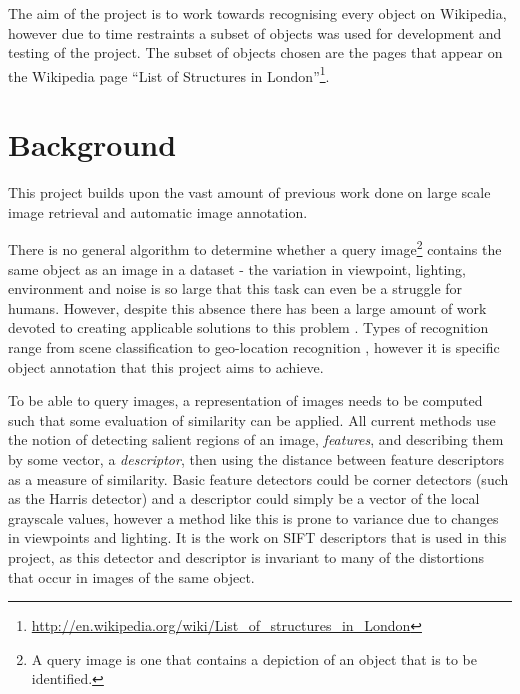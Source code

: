\documentclass[11pt, onecolumn, a4paper, final]{report} %
\begin{document}
The aim of the project is to work towards recognising every object on Wikipedia, however due to time restraints a subset of objects was used for development and testing of the project. The subset of objects chosen are the pages that appear on the Wikipedia page ``List of Structures in London''\footnote{\url{http://en.wikipedia.org/wiki/List_of_structures_in_London}}.
	


\chapter{Background}
\label{chpt:background}
This project builds upon the vast amount of previous work done on large scale image retrieval and automatic image annotation.

There is no general algorithm to determine whether a query image\footnote{A query image is one that contains a depiction of an object that is to be identified.} contains the same object as an image in a dataset - the variation in viewpoint, lighting, environment and noise is so large that this task can even be a struggle for humans. However, despite this absence there has been a large amount of work devoted to creating applicable solutions to this problem \cite{quack09,rootsift12,recognitiontree2006,videogoogle2003,philbin2007}. Types of recognition range from scene classification \cite{sceneclass06} to geo-location recognition \cite{knopp10}, however it is specific object annotation that this project aims to achieve.

To be able to query images, a representation of images needs to be computed such that some evaluation of similarity can be applied. All current methods use the notion of detecting salient regions of an image, \emph{features}, and describing them by some vector, a \emph{descriptor}, then using the distance between feature descriptors as a measure of similarity. Basic feature detectors could be corner detectors (such as the Harris detector) and a descriptor could simply be a vector of the local grayscale values, however a method like this is prone to variance due to changes in viewpoints and lighting. It is the work on SIFT descriptors \cite{lowe1999} that is used in this project, as this detector and descriptor is invariant to many of the distortions that occur in images of the same object.
\end{document}
